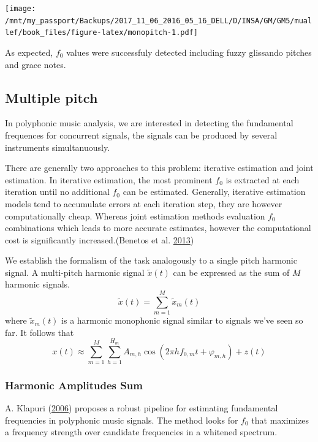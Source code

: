\documentclass[
  american,
]{article}
\begin{document}
\texttt{[image: /mnt/my\_passport/Backups/2017\_11\_06\_2016\_05\_16\_DELL/D/INSA/GM/GM5/muallef/book\_files/figure-latex/monopitch-1.pdf]}

As expected, \(f_0\) values were successfuly detected
including fuzzy glissando pitches and grace notes.

\hypertarget{multiple-pitch}{%
\subsection{Multiple pitch}\label{multiple-pitch}}

In polyphonic music analysis, we are interested in detecting
the fundamental frequences for concurrent signals,
the signals can be produced by several instruments simultanuously.

There are generally two approaches to this problem:
iterative estimation and joint estimation.
In iterative estimation, the most prominent \(f_0\) is extracted
at each iteration until no additional \(f_0\) can be estimated.
Generally, iterative estimation models tend to accumulate errors
at each iteration step, they are however computationally cheap.
Whereas joint estimation methods evaluation \(f_0\) combinations
which leads to more accurate estimates, however
the computational cost is significantly increased.(Benetos et al. \protect\hyperlink{ref-benetos_2013}{2013})

We establish the formalism of the task analogously to
a single pitch harmonic signal.
A multi-pitch harmonic signal \(\tilde{x}(t)\) can be expressed as the
sum of \(M\) harmonic signals.
\[\tilde{x}(t)=\sum_{m=1}^M \tilde{x}_m(t)\]
where \(\tilde{x}_m(t)\) is a harmonic monophonic signal
similar to signals we've seen so far.
It follows that
\[x(t)\approx \sum_{m=1}^{M} \sum_{h=1}^{H_m}
    A_{m,h} \cos(2\pi h f_{0,m}t + \varphi_{m,h}) + z(t)\]

\hypertarget{harmonic-amplitudes-sum}{%
\subsubsection{Harmonic Amplitudes Sum}\label{harmonic-amplitudes-sum}}

A. Klapuri (\protect\hyperlink{ref-klapuri}{2006}) proposes a robust pipeline for estimating
fundamental frequencies in polyphonic music signals.
The method looks for \(f_0\) that maximizes a frequency
strength over candidate frequencies in a whitened spectrum.
\end{document}
